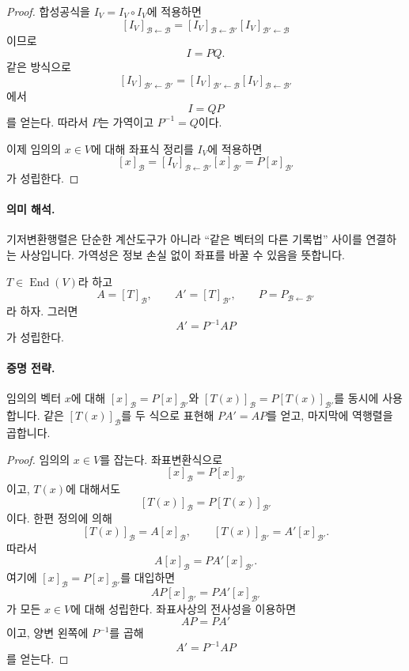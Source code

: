 \begin{proof}
합성공식을 $I_V=I_V\circ I_V$에 적용하면
$$
[I_V]_{\mathcal B\leftarrow\mathcal B}
=
[I_V]_{\mathcal B\leftarrow\mathcal B'}
[I_V]_{\mathcal B'\leftarrow\mathcal B}
$$
이므로
$$
I=PQ.
$$
같은 방식으로
$$
[I_V]_{\mathcal B'\leftarrow\mathcal B'}
=
[I_V]_{\mathcal B'\leftarrow\mathcal B}
[I_V]_{\mathcal B\leftarrow\mathcal B'}
$$
에서
$$
I=QP
$$
를 얻는다. 따라서 $P$는 가역이고 $P^{-1}=Q$이다.

이제 임의의 $x\in V$에 대해 좌표식 정리를 $I_V$에 적용하면
$$
[x]_{\mathcal B}
=
[I_V]_{\mathcal B\leftarrow\mathcal B'}[x]_{\mathcal B'}
=
P[x]_{\mathcal B'}
$$
가 성립한다.
\end{proof}

\paragraph{의미 해석.}
기저변환행렬은 단순한 계산도구가 아니라 ``같은 벡터의 다른 기록법'' 사이를 연결하는 사상입니다. 가역성은 정보 손실 없이 좌표를 바꿀 수 있음을 뜻합니다.

\begin{theorem}
$T\in\operatorname{End}(V)$라 하고
$$
A=[T]_{\mathcal B},\qquad A'=[T]_{\mathcal B'},\qquad
P=P_{\mathcal B\leftarrow\mathcal B'}
$$
라 하자. 그러면
$$
A'=P^{-1}AP
$$
가 성립한다.
\end{theorem}

\paragraph{증명 전략.}
임의의 벡터 $x$에 대해 $[x]_{\mathcal B}=P[x]_{\mathcal B'}$와 $[T(x)]_{\mathcal B}=P[T(x)]_{\mathcal B'}$를 동시에 사용합니다. 같은 $[T(x)]_{\mathcal B}$를 두 식으로 표현해 $PA'=AP$를 얻고, 마지막에 역행렬을 곱합니다.

\begin{proof}
임의의 $x\in V$를 잡는다. 좌표변환식으로
$$
[x]_{\mathcal B}=P[x]_{\mathcal B'}
$$
이고, $T(x)$에 대해서도
$$
[T(x)]_{\mathcal B}=P[T(x)]_{\mathcal B'}
$$
이다. 한편 정의에 의해
$$
[T(x)]_{\mathcal B}=A[x]_{\mathcal B},\qquad
[T(x)]_{\mathcal B'}=A'[x]_{\mathcal B'}.
$$
따라서
$$
A[x]_{\mathcal B}=P A'[x]_{\mathcal B'}.
$$
여기에 $[x]_{\mathcal B}=P[x]_{\mathcal B'}$를 대입하면
$$
AP[x]_{\mathcal B'}=PA'[x]_{\mathcal B'}
$$
가 모든 $x\in V$에 대해 성립한다. 좌표사상의 전사성을 이용하면
$$
AP=PA'
$$
이고, 양변 왼쪽에 $P^{-1}$를 곱해
$$
A'=P^{-1}AP
$$
를 얻는다.
\end{proof}

